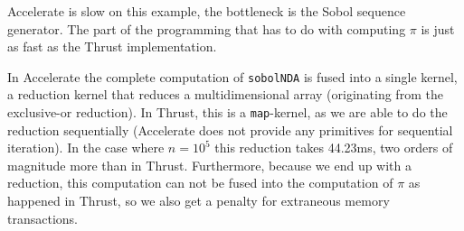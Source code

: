 \documentclass[preprint]{sigplanconf}
\begin{document}



Accelerate is slow on this example, the bottleneck is the Sobol
sequence generator. The part of the programming that has to do with
computing $\pi$ is just as fast as the Thrust implementation. 

In Accelerate the complete computation of \verb|sobolNDA| is fused
into a single kernel, a reduction kernel that reduces a
multidimensional array (originating from the exclusive-or
reduction). In Thrust, this is a \verb|map|-kernel, as we are able to
do the reduction sequentially (Accelerate does not provide any
primitives for sequential iteration). In the case where $n=10^5$ this
reduction takes 44.23ms, two orders of magnitude more than in
Thrust. Furthermore, because we end up with a reduction, this
computation can not be fused into the computation of $\pi$ as happened
in Thrust, so we also get a penalty for extraneous memory
transactions.
\end{document}
